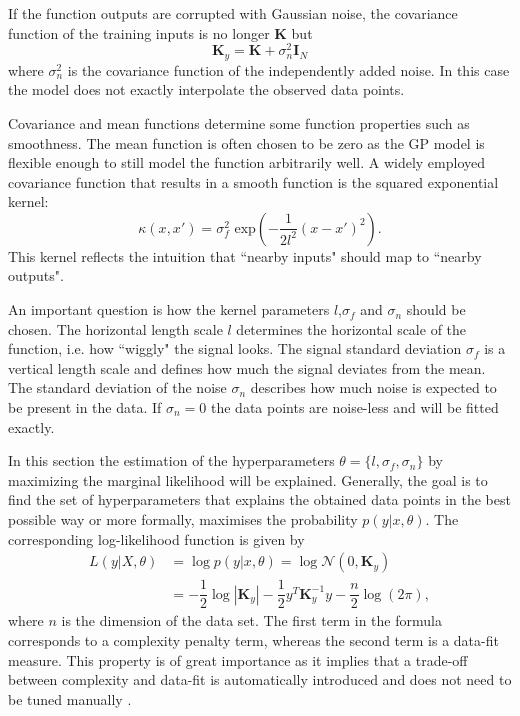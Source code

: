 \documentclass[../main.tex]{subfiles}
\begin{document}
If the function outputs are corrupted with Gaussian noise, the covariance function of the training inputs is no longer $\mathbf{K}$ but
\begin{equation}
    \mathbf{K}_y = \mathbf{K} + \sigma_n^2\mathbf{I}_N
\end{equation}
where $\sigma_n^2$ is the covariance function of the independently added noise. In this case the model does not exactly interpolate the observed data points.\par
Covariance and mean functions determine some function properties such as smoothness. The mean function is often chosen to be zero as the GP model is flexible enough to still model the function arbitrarily well. A widely employed covariance function that results in a smooth function is the squared exponential kernel:
\begin{equation}\label{eq:sqexp}
    \kappa(x,x') = \sigma^2_f \text{ exp}\left(-\dfrac{1}{2l^2}(x-x')^2\right).
\end{equation}
This kernel reflects the intuition that ``nearby inputs" should map to ``nearby outputs". \par 
An important question is how the kernel parameters $l$,$\sigma_f$ and $\sigma_n$ should be chosen. The horizontal length scale $l$ determines the horizontal scale of the function, i.e. how ``wiggly" the signal looks. The signal standard deviation $\sigma_f$ is a vertical length scale and defines how much the signal deviates from the mean. The standard deviation of the noise $\sigma_n$ describes how much noise is expected to be present in the data. If $\sigma_n = 0$ the data points are noise-less and will be fitted exactly. \par
In this section the estimation of the hyperparameters $\theta = \{l,\sigma_f, \sigma_n\}$ by maximizing the marginal likelihood will be explained. Generally, the goal is to find the set of hyperparameters that explains the obtained data points in the best possible way or more formally, maximises the probability $p(y|x,\theta)$. The corresponding log-likelihood function is given by
\begin{align}
    L(y|X, \theta) &= \log p(y|x,\theta) = \log \mathcal{N}(0,\mathbf{K}_y)\\
    &= -\dfrac{1}{2} \log|\mathbf{K}_y|-\dfrac{1}{2}y^T\mathbf{K}_y^{-1}y-\dfrac{n}{2}\log(2\pi),
\end{align}
where $n$ is the dimension of the data set. The first term in the formula corresponds to a complexity penalty term, whereas the second term is a data-fit measure. This property is of great importance as it implies that a trade-off between complexity and data-fit is automatically introduced and does not need to be tuned manually \cite{rasmussen2006gaussian}. 
\end{document}
